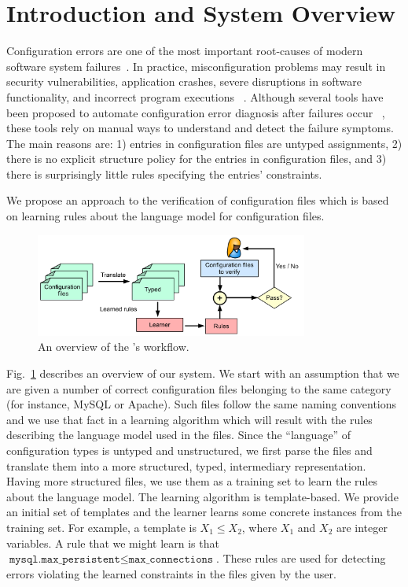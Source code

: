 \section{Introduction and System Overview}
\label{sec:Intro}

Configuration errors are one of the most important root-causes of 
modern software system failures~\cite{xu15systems,yin11anempirical}. 
In practice, misconfiguration problems may result in 
security vulnerabilities,
application crashes, severe disruptions in software functionality,
and incorrect program executions%
~\cite{xu15systems,zhang14encore,yuan11context}.
Although several tools have been proposed to automate configuration
error diagnosis after failures occur%
~\cite{wang04automatic,attariyan10automating,%
su07autobash,whitaker04configuration}, 
these tools rely on manual ways to understand and detect the failure 
symptoms. The main reasons are:
1) entries in configuration files are untyped assignments, 
2) there is no explicit structure policy for the entries in 
configuration files, and 3) there is surprisingly little rules 
specifying the entries' constraints.

We propose an approach to the verification of  
configuration files which is based on learning rules about the language 
model for configuration files. 

\begin{figure}[t] \centering
\includegraphics[width=0.8\textwidth]{figs/overview}
\caption{An overview of the \app's workflow.}
\label{fig-overview}
\end{figure}

Fig.~\ref{fig-overview} describes an overview of our system. We start with
an assumption that we are given a number of correct configuration files belonging to the same category (for instance, MySQL or Apache). Such files
follow the same naming conventions and we use that fact in a learning 
algorithm which will result with the rules describing the language model used in the files. Since the ``language'' of configuration types is untyped and unstructured, we first parse the files and translate them 
into a more structured, typed, intermediary representation. Having more structured files, we use them as a training set to learn the rules about the 
language model. The learning algorithm is template-based. We provide an initial set of
templates and the learner learns some concrete instances from 
the training set. For example, a template is $X_1 \le X_2$, where $X_1$ and $X_2$ are integer variables. A rule that we might learn is that
$\texttt{mysql.max\_persistent} \le \texttt{max\_connections}$.
These rules are used for detecting errors violating the learned constraints in the files given by the user.

